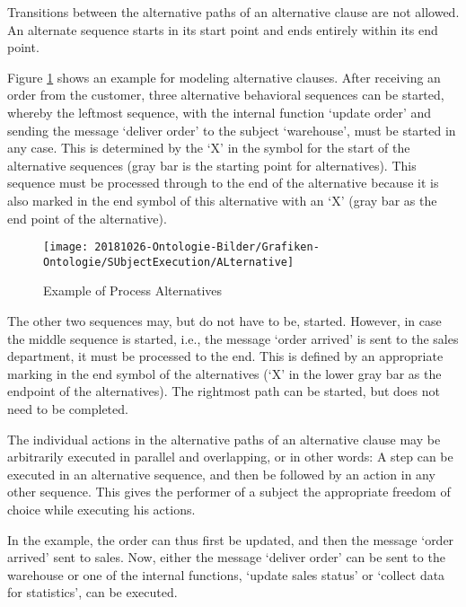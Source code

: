 Transitions between the alternative paths of an alternative clause are not allowed. An alternate sequence starts in its start point and ends entirely within its end point.

Figure \ref{fig:alternative} shows an example for modeling alternative clauses. After receiving an order from the customer, three alternative behavioral sequences can be started, whereby the leftmost sequence, with the internal function ‘update order’ and sending the message ‘deliver order’ to the subject ‘warehouse’, must be started in any case. This is determined by the ‘X’ in the symbol for the start of the alternative sequences (gray bar is the starting point for alternatives). This sequence must be processed through to the end of the alternative because it is also marked in the end symbol of this alternative with an ‘X’ (gray bar as the end point of the alternative).

\begin{figure}[h!]
	\centering
	\texttt{[image: 20181026-Ontologie-Bilder/Grafiken-Ontologie/SUbjectExecution/ALternative]}
	\caption[Example of Process Alternatives]{Example of Process Alternatives}
	\label{fig:alternative}
\end{figure}

The other two sequences may, but do not have to be, started. However, in case the middle sequence is started, i.e., the message ‘order arrived’ is sent to the sales department, it must be processed to the end. This is defined by an appropriate marking in the end symbol of the alternatives (‘X’ in the lower gray bar as the endpoint of the alternatives). The rightmost path can be started, but does not need to be completed.

The individual actions in the alternative paths of an alternative clause may be arbitrarily executed in parallel and overlapping, or in other words: A step can be executed in an alternative sequence, and then be followed by an action in any other sequence. This gives the performer of a subject the appropriate freedom of choice while executing his actions.

In the example, the order can thus first be updated, and then the message ‘order arrived’ sent to sales. Now, either the message ‘deliver order’ can be sent to the warehouse or one of the internal functions, ‘update sales status’ or ‘collect data for statistics’, can be executed.


